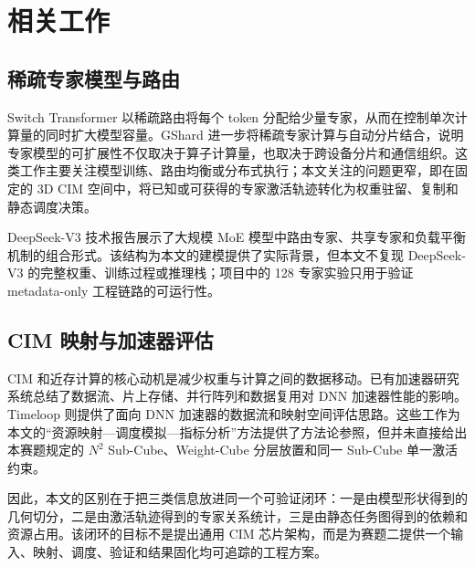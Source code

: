 \section{相关工作}
\subsection{稀疏专家模型与路由}
Switch Transformer 以稀疏路由将每个 token 分配给少量专家，从而在控制单次计算量的同时扩大模型容量\cite{fedus2022switch}。GShard 进一步将稀疏专家计算与自动分片结合，说明专家模型的可扩展性不仅取决于算子计算量，也取决于跨设备分片和通信组织\cite{lepikhin2021gshard}。这类工作主要关注模型训练、路由均衡或分布式执行；本文关注的问题更窄，即在固定的 3D CIM 空间中，将已知或可获得的专家激活轨迹转化为权重驻留、复制和静态调度决策。

DeepSeek-V3 技术报告展示了大规模 MoE 模型中路由专家、共享专家和负载平衡机制的组合形式\cite{deepseek2024v3}。该结构为本文的建模提供了实际背景，但本文不复现 DeepSeek-V3 的完整权重、训练过程或推理栈；项目中的 128 专家实验只用于验证 metadata-only 工程链路的可运行性。

\subsection{CIM 映射与加速器评估}
CIM 和近存计算的核心动机是减少权重与计算之间的数据移动。已有加速器研究系统总结了数据流、片上存储、并行阵列和数据复用对 DNN 加速器性能的影响\cite{sze2017efficient}。Timeloop 则提供了面向 DNN 加速器的数据流和映射空间评估思路\cite{parashar2019timeloop}。这些工作为本文的“资源映射—调度模拟—指标分析”方法提供了方法论参照，但并未直接给出本赛题规定的 $N^2$ Sub-Cube、Weight-Cube 分层放置和同一 Sub-Cube 单一激活约束。

因此，本文的区别在于把三类信息放进同一个可验证闭环：一是由模型形状得到的几何切分，二是由激活轨迹得到的专家关系统计，三是由静态任务图得到的依赖和资源占用。该闭环的目标不是提出通用 CIM 芯片架构，而是为赛题二提供一个输入、映射、调度、验证和结果固化均可追踪的工程方案。
